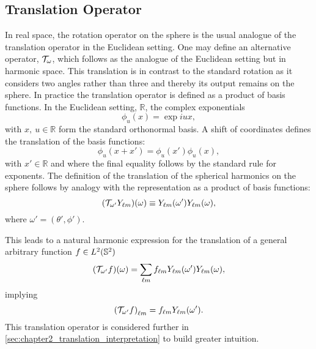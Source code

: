 \subsection{Translation Operator}\label{sec:chapter2_translation_operator}

In real space, the rotation operator on the sphere is the usual analogue of the translation operator in the Euclidean setting.
One may define an alternative operator, \(\translation{\omega}\), which follows as the analogue of the Euclidean setting but in harmonic space.
This translation is in contrast to the standard rotation as it considers two angles rather than three and thereby its output remains on the sphere.
In practice the translation operator is defined as a product of basis functions.
In the Euclidean setting, \eg{} \(\mathbb{R}\), the complex exponentials
%
\begin{equation}
	\phi_{u}(x)
	= \exp{iux},
\end{equation}
%
with \(x,\ u \in \mathbb{R}\) form the standard orthonormal basis.
A shift of coordinates defines the translation of the basis functions:
%
\begin{equation}
	\phi_{u}(x + x')
	= \phi_{u}(x') \phi_{u}(x),
\end{equation}
%
with \(x' \in \mathbb{R}\) and where the final equality follows by the standard rule for exponents.
The definition of the translation of the spherical harmonics on the sphere follows by analogy with the representation as a product of basis functions:
%
\begin{equation}
	\pixel{(\translation{\omega'}\harmonic{Y})} \equiv \pixel[']{\harmonic{Y}} \pixel{\harmonic{Y}},
\end{equation}
%
where \(\omega'=(\theta',\phi')\).

This leads to a natural harmonic expression for the translation of a general arbitrary function \(f \in \hilbert{\twoSphere}\)
%
\begin{equation}\label{eq:chapter2_translation_real}
	\pixel{(\translation{\omega'}f)}
	= \harmonicSum \harmonic{f} \pixel[']{\harmonic{Y}} \pixel{\harmonic{Y}},
\end{equation}
%
implying
%
\begin{equation}\label{eq:chapter2_translation_harmonic}
	\harmonic{(\translation{\omega'}f)}
	= \harmonic{f} \pixel[']{\harmonic{Y}}.
\end{equation}
%
This translation operator is considered further in \cref{sec:chapter2_translation_interpretation} to build greater intuition.

